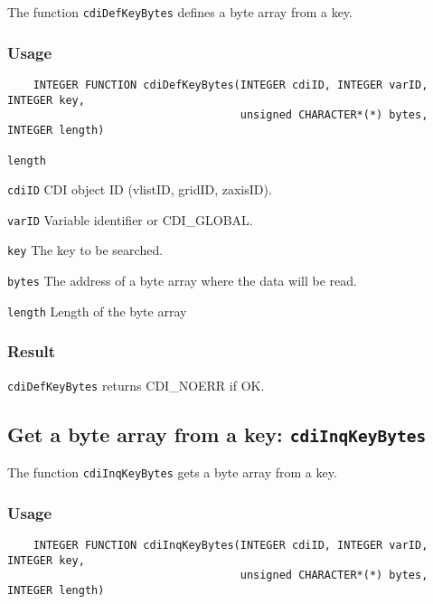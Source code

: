 The function {\texttt{cdiDefKeyBytes}} defines a byte array from a key.

\subsubsection*{Usage}

\begin{verbatim}
    INTEGER FUNCTION cdiDefKeyBytes(INTEGER cdiID, INTEGER varID, INTEGER key, 
                                    unsigned CHARACTER*(*) bytes, INTEGER length)
\end{verbatim}

\hspace*{4mm}\begin{minipage}[]{15cm}
\begin{deflist}{\texttt{length}\ }
\item[\texttt{cdiID}]
CDI object ID (vlistID, gridID, zaxisID).
\item[\texttt{varID}]
Variable identifier or CDI\_GLOBAL.
\item[\texttt{key}]
The key to be searched.
\item[\texttt{bytes}]
The address of a byte array where the data will be read.
\item[\texttt{length}]
Length of the byte array

\end{deflist}
\end{minipage}

\subsubsection*{Result}

{\texttt{cdiDefKeyBytes}} returns CDI\_NOERR if OK.



\subsection{Get a byte array from a key: \texttt{cdiInqKeyBytes}}
\label{cdiInqKeyBytes}

The function {\texttt{cdiInqKeyBytes}} gets a byte array from a key.

\subsubsection*{Usage}

\begin{verbatim}
    INTEGER FUNCTION cdiInqKeyBytes(INTEGER cdiID, INTEGER varID, INTEGER key, 
                                    unsigned CHARACTER*(*) bytes, INTEGER length)
\end{verbatim}

